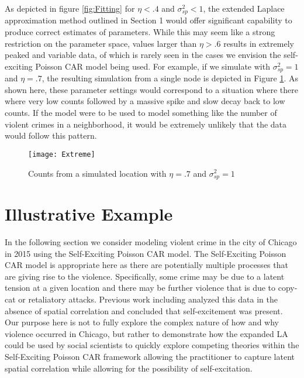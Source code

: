 \documentclass[11pt]{isuthesis}
\begin{document}
	As depicted in figure \ref{fig:Fitting} for $\eta < .4$ and $\sigma_{sp}^2<1$, the extended Laplace approximation method outlined in Section 1 would offer significant capability to produce correct estimates of parameters.  While this may seem like a strong restriction on the parameter space, values larger than $\eta> .6$ results in extremely peaked and variable data, of which is rarely seen in the cases we envision the self-exciting Poisson CAR model being used.  For example, if we simulate with $\sigma_{sp}^2=1$ and $\eta=.7$, the resulting simulation from a single node is depicted in Figure \ref{fig:Extreme}.  As shown here, these parameter settings would correspond to a situation where there where very low counts followed by a massive spike and slow decay back to low counts.  If the model were to be used to model something like the number of violent crimes in a neighborhood, it would be extremely unlikely that the data would follow this pattern.
	
	\begin{figure}[!htp]
		\centering
		\texttt{[image: Extreme]}
		\caption{Counts from a simulated location with $\eta=.7$ and $\sigma_{sp}^2=1$}\label{fig:Extreme}
	\end{figure}
	
	
	
	\section{Illustrative Example}
	
	In the following section we consider modeling violent crime in the city of Chicago in 2015 using the Self-Exciting Poisson CAR model.  The Self-Exciting Poisson CAR model is appropriate here as there are potentially multiple processes that are giving rise to the violence.  Specifically, some crime may be due to a latent tension at a given location and there may be further violence that is due to copy-cat or retaliatory attacks.  Previous work including \cite{mohler2013modeling} analyzed this data in the absence of spatial correlation and concluded that self-excitement was present.  Our purpose here is not to fully explore the complex nature of how and why violence occurred in Chicago, but rather to demonstrate how the expanded LA could be used by social scientists to quickly explore competing theories within the Self-Exciting Poisson CAR framework allowing the practitioner to capture latent spatial correlation while allowing for the possibility of self-excitation.
	
\end{document}

